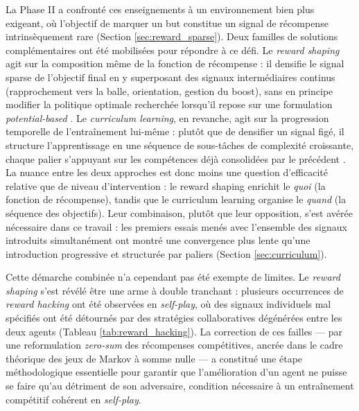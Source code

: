 La Phase II a confronté ces enseignements à un environnement bien plus exigeant, où l'objectif de marquer un but constitue un signal de récompense intrinsèquement rare (Section \ref{sec:reward_sparse}). Deux familles de solutions complémentaires ont été mobilisées pour répondre à ce défi. Le \textit{reward shaping} agit sur la composition même de la fonction de récompense : il densifie le signal sparse de l'objectif final en y superposant des signaux intermédiaires continus (rapprochement vers la balle, orientation, gestion du boost), sans en principe modifier la politique optimale recherchée lorsqu'il repose sur une formulation \textit{potential-based} \parencite{645528.657613}. Le \textit{curriculum learning}, en revanche, agit sur la progression temporelle de l'entraînement lui-même : plutôt que de densifier un signal figé, il structure l'apprentissage en une séquence de sous-tâches de complexité croissante, chaque palier s'appuyant sur les compétences déjà consolidées par le précédent \parencite{narvekarCurriculumLearningReinforcement2020}. La nuance entre les deux approches est donc moins une question d'efficacité relative que de niveau d'intervention : le reward shaping enrichit le \textit{quoi} (la fonction de récompense), tandis que le curriculum learning organise le \textit{quand} (la séquence des objectifs). Leur combinaison, plutôt que leur opposition, s'est avérée nécessaire dans ce travail : les premiers essais menés avec l'ensemble des signaux introduits simultanément ont montré une convergence plus lente qu'une introduction progressive et structurée par paliers (Section \ref{sec:curriculum}).

Cette démarche combinée n'a cependant pas été exempte de limites. Le \textit{reward shaping} s'est révélé être une arme à double tranchant : plusieurs occurrences de \textit{reward hacking} \parencite{amodeiConcreteProblemsAI2016} ont été observées en \textit{self-play}, où des signaux individuels mal spécifiés ont été détournés par des stratégies collaboratives dégénérées entre les deux agents (Tableau \ref{tab:reward_hacking}). La correction de ces failles — par une reformulation \textit{zero-sum} des récompenses compétitives, ancrée dans le cadre théorique des jeux de Markov à somme nulle \parencite{littmanMarkovGamesFramework1994} — a constitué une étape méthodologique essentielle pour garantir que l'amélioration d'un agent ne puisse se faire qu'au détriment de son adversaire, condition nécessaire à un entraînement compétitif cohérent en \textit{self-play}.

